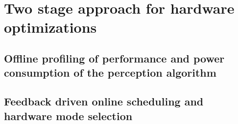 \section{Two stage approach for hardware optimizations}

\subsection{Offline profiling of performance and power consumption of the perception algorithm}



\subsection{Feedback driven online scheduling and hardware mode selection}
\label{sec:scheduling}

